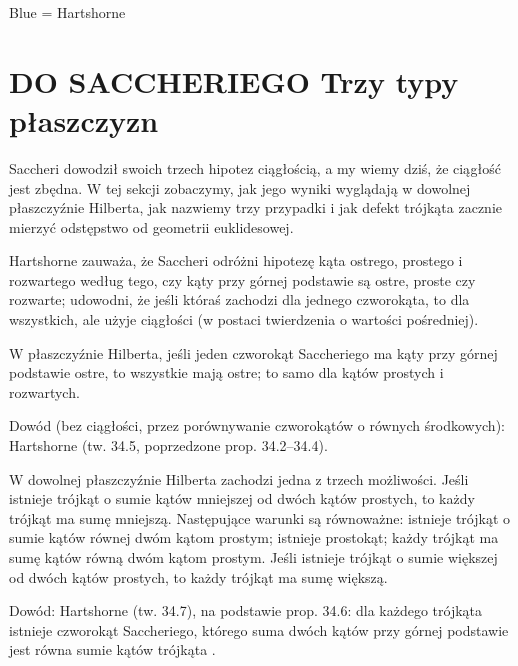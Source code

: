 \color{blue}
Blue = Hartshorne
\section{DO SACCHERIEGO Trzy typy płaszczyzn} %
\label{sekcja_trzy_typy}

Saccheri dowodził swoich trzech hipotez ciągłością, a my wiemy dziś, że ciągłość jest zbędna. %
W tej sekcji zobaczymy, jak jego wyniki wyglądają w dowolnej płaszczyźnie Hilberta, jak nazwiemy trzy przypadki i jak defekt trójkąta zacznie mierzyć odstępstwo od geometrii euklidesowej. %

Hartshorne \cite[s. 307]{hartshorne_2000} zauważa, że Saccheri odróżni hipotezę kąta ostrego, prostego i rozwartego według tego, czy kąty przy górnej podstawie są ostre, proste czy rozwarte; udowodni, że jeśli któraś zachodzi dla jednego czworokąta, to dla wszystkich, ale użyje ciągłości (w postaci twierdzenia o wartości pośredniej). %

\begin{theorem}
[Saccheriego] %
	W płaszczyźnie Hilberta, jeśli jeden czworokąt Saccheriego ma kąty przy górnej podstawie ostre, to wszystkie mają ostre; to samo dla kątów prostych i rozwartych. %
\end{theorem}

Dowód (bez ciągłości, przez porównywanie czworokątów o równych środkowych): Hartshorne \cite[s. 307--309]{hartshorne_2000} (tw. 34.5, poprzedzone prop. 34.2--34.4). %

\begin{theorem}
	W dowolnej płaszczyźnie Hilberta zachodzi jedna z trzech możliwości. %
	Jeśli istnieje trójkąt o sumie kątów mniejszej od dwóch kątów prostych, to każdy trójkąt ma sumę mniejszą. %
	Następujące warunki są równoważne: istnieje trójkąt o sumie kątów równej dwóm kątom prostym; istnieje prostokąt; każdy trójkąt ma sumę kątów równą dwóm kątom prostym. %
	Jeśli istnieje trójkąt o sumie większej od dwóch kątów prostych, to każdy trójkąt ma sumę większą. %
\end{theorem}

Dowód: Hartshorne \cite[s. 309--311]{hartshorne_2000} (tw. 34.7), na podstawie prop. 34.6: dla każdego trójkąta istnieje czworokąt Saccheriego, którego suma dwóch kątów przy górnej podstawie jest równa sumie kątów trójkąta \cite[s. 310]{hartshorne_2000}. %

